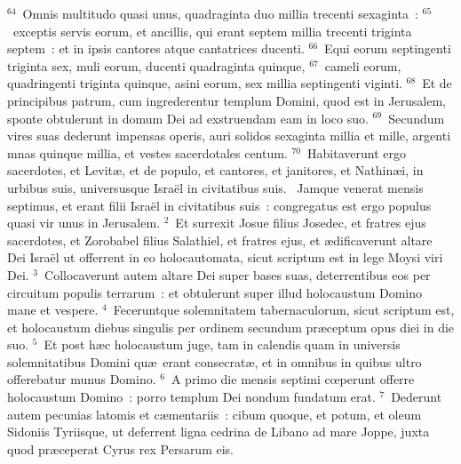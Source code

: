 ${}^{64}$~Omnis multitudo quasi unus, quadraginta duo millia trecenti sexaginta~:
${}^{65}$~exceptis servis eorum, et ancillis, qui erant septem millia trecenti triginta septem~: et in ipsis cantores atque cantatrices ducenti.
${}^{66}$~Equi eorum septingenti triginta sex, muli eorum, ducenti quadraginta quinque,
${}^{67}$~cameli eorum, quadringenti triginta quinque, asini eorum, sex millia septingenti viginti.
${}^{68}$~Et de principibus patrum, cum ingrederentur templum Domini, quod est in Jerusalem, sponte obtulerunt in domum Dei ad exstruendam eam in loco suo.
${}^{69}$~Secundum vires suas dederunt impensas operis, auri solidos sexaginta millia et mille, argenti mnas quinque millia, et vestes sacerdotales centum.
${}^{70}$~Habitaverunt ergo sacerdotes, et Levit\ae , et de populo, et cantores, et janitores, et Nathin\ae i, in urbibus suis, universusque Isra\"el in civitatibus suis.
~Jamque venerat mensis septimus, et erant filii Isra\"el in civitatibus suis~: congregatus est ergo populus quasi vir unus in Jerusalem.
${}^{2}$~Et surrexit Josue filius Josedec, et fratres ejus sacerdotes, et Zorobabel filius Salathiel, et fratres ejus, et \ae dificaverunt altare Dei Isra\"el ut offerrent in eo holocautomata, sicut scriptum est in lege Moysi viri Dei.
${}^{3}$~Collocaverunt autem altare Dei super bases suas, deterrentibus eos per circuitum populis terrarum~: et obtulerunt super illud holocaustum Domino mane et vespere.
${}^{4}$~Feceruntque solemnitatem tabernaculorum, sicut scriptum est, et holocaustum diebus singulis per ordinem secundum pr\ae ceptum opus diei in die suo.
${}^{5}$~Et post h\ae c holocaustum juge, tam in calendis quam in universis solemnitatibus Domini qu\ae\ erant consecrat\ae , et in omnibus in quibus ultro offerebatur munus Domino.
${}^{6}$~A primo die mensis septimi cœperunt offerre holocaustum Domino~: porro templum Dei nondum fundatum erat.
${}^{7}$~Dederunt autem pecunias latomis et c\ae mentariis~: cibum quoque, et potum, et oleum Sidoniis Tyriisque, ut deferrent ligna cedrina de Libano ad mare Joppe, juxta quod pr\ae ceperat Cyrus rex Persarum eis.


